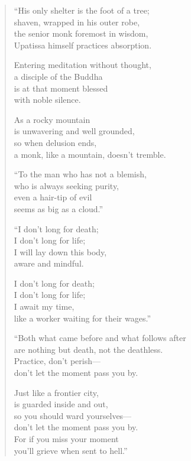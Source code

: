 \documentclass[12pt,openany]{book}%
\begin{document}
\begin{verse}
“His only shelter is the foot of a tree; \\
shaven, wrapped in his outer robe, \\
the senior monk foremost in wisdom, \\
Upatissa himself practices absorption. 

Entering meditation without thought, \\
a disciple of the Buddha \\
is at that moment blessed \\
with noble silence. 

As a rocky mountain \\
is unwavering and well grounded, \\
so when delusion ends, \\
a monk, like a mountain, doesn’t tremble. 

“To the man who has not a blemish, \\
who is always seeking purity, \\
even a hair-tip of evil \\
seems as big as a cloud.” 

“I don’t long for death; \\
I don’t long for life; \\
I will lay down this body, \\
aware and mindful. 

I don’t long for death; \\
I don’t long for life; \\
I await my time, \\
like a worker waiting for their wages.” 

“Both what came before and what follows after \\
are nothing but death, not the deathless. \\
Practice, don’t perish—\\
don’t let the moment pass you by. 

Just like a frontier city, \\
is guarded inside and out, \\
so you should ward yourselves—\\
don’t let the moment pass you by. \\
For if you miss your moment \\
you’ll grieve when sent to hell.” 


\end{verse}
\end{document}
